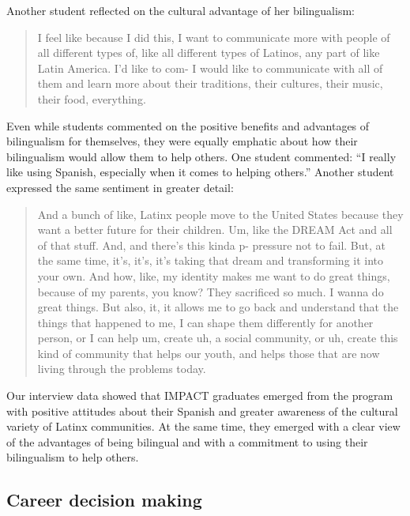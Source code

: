 \documentclass[output=paper]{langscibook}
\begin{document}
Another student reflected on the cultural advantage of her bilingualism:

\begin{quote}
I feel like because I did this, I want to communicate more with people of all different types of, like all different types of Latinos, any part of like Latin America. I'd like to com- I would like to communicate with all of them and learn more about their traditions, their cultures, their music, their food, everything.
\end{quote}

Even while students commented on the positive benefits and advantages of bilingualism for themselves, they were equally emphatic about how their bilingualism would allow them to help others. One student commented: “I really like using Spanish, especially when it comes to helping others.” Another student expressed the same sentiment in greater detail:

\begin{quote}
And a bunch of like, Latinx people move to the United States because they want a better future for their children. Um, like the DREAM Act and all of that stuff. And, and there's this kinda p- pressure not to fail. But, at the same time, it's, it's, it's taking that dream and transforming it into your own. And how, like, my identity makes me want to do great things, because of my parents, you know? They sacrificed so much. I wanna do great things. But also, it, it allows me to go back and understand that the things that happened to me, I can shape them differently for another person, or I can help um, create uh, a social community, or uh, create this kind of community that helps our youth, and helps those that are now living through the problems today.
\end{quote}

Our interview data showed that IMPACT graduates emerged from the program with positive attitudes about their Spanish and greater awareness of the cultural variety of Latinx communities. At the same time, they emerged with a clear view of the advantages of being bilingual and with a commitment to using their bilingualism to help others.

\subsection{Career decision making}
\end{document}
